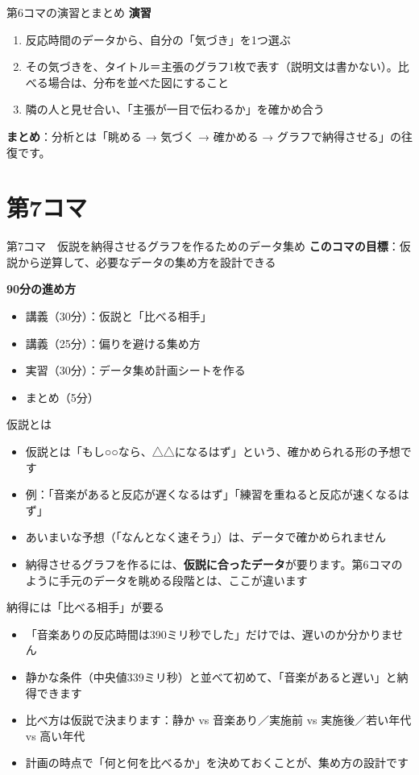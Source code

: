 \documentclass[aspectratio=169,11pt]{beamer}
\newcommand{\sess}[3]{%
\begin{frame}{#1}
\textbf{このコマの目標}：#2

\vspace{0.6em}
\textbf{90分の進め方}
\begin{itemize}
#3
\end{itemize}
\end{frame}}
\begin{document}
\begin{frame}{第6コマの演習とまとめ}
\textbf{演習}
\begin{enumerate}
\item 反応時間のデータから、自分の「気づき」を1つ選ぶ
\item その気づきを、タイトル＝主張のグラフ1枚で表す（説明文は書かない）。比べる場合は、分布を並べた図にすること
\item 隣の人と見せ合い、「主張が一目で伝わるか」を確かめ合う
\end{enumerate}
\vspace{0.5em}
\textbf{まとめ}：分析とは「眺める → 気づく → 確かめる → グラフで納得させる」の往復です。
\end{frame}

\section{第7コマ}
\sess{第7コマ　仮説を納得させるグラフを作るためのデータ集め}{仮説から逆算して、必要なデータの集め方を設計できる}
{\item 講義（30分）：仮説と「比べる相手」
\item 講義（25分）：偏りを避ける集め方
\item 実習（30分）：データ集め計画シートを作る
\item まとめ（5分）}

\begin{frame}{仮説とは}
\begin{itemize}
\item 仮説とは「もし○○なら、△△になるはず」という、確かめられる形の予想です
\item 例：「音楽があると反応が遅くなるはず」「練習を重ねると反応が速くなるはず」
\item あいまいな予想（「なんとなく速そう」）は、データで確かめられません
\item 納得させるグラフを作るには、\textbf{仮説に合ったデータ}が要ります。第6コマのように手元のデータを眺める段階とは、ここが違います
\end{itemize}
\end{frame}

\begin{frame}{納得には「比べる相手」が要る}
\begin{itemize}
\item 「音楽ありの反応時間は390ミリ秒でした」だけでは、遅いのか分かりません
\item 静かな条件（中央値339ミリ秒）と並べて初めて、「音楽があると遅い」と納得できます
\item 比べ方は仮説で決まります：静か vs 音楽あり／実施前 vs 実施後／若い年代 vs 高い年代
\item 計画の時点で「何と何を比べるか」を決めておくことが、集め方の設計です
\end{itemize}
\end{frame}
\end{document}
